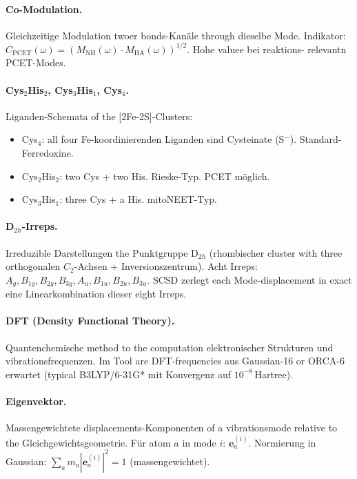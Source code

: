 \documentclass[11pt,a4paper,twoside]{article}
\theoremstyle{remark}
\begin{document}
\paragraph{Co-Modulation.}
Gleichzeitige Modulation twoer bonds-Kan\"ale through dieselbe
Mode. Indikator: $C_\text{PCET}(\omega) = (M_\text{NH}(\omega)
\cdot M_\text{HA}(\omega))^{1/2}$. Hohe valuee bei reaktions-
relevantn PCET-Modes.

\paragraph{Cys$_2$His$_2$, Cys$_3$His$_1$, Cys$_4$.}
Liganden-Schemata of the [2Fe-2S]-Clusters:
\begin{itemize}\setlength{\itemsep}{0pt}
  \item Cys$_4$: all four Fe-koordinierenden Liganden sind
        Cysteinate (S$^-$). Standard-Ferredoxine.
  \item Cys$_2$His$_2$: two Cys + two His. Rieske-Typ. PCET m\"oglich.
  \item Cys$_3$His$_1$: three Cys + a His. mitoNEET-Typ.
\end{itemize}

\paragraph{D$_{2h}$-Irreps.}
Irreduzible Darstellungen the Punktgruppe D$_{2h}$ (rhombischer
cluster with three orthogonalen $C_2$-Achsen + Inversionszentrum).
Acht Irreps: $A_g, B_{1g}, B_{2g}, B_{3g}, A_u, B_{1u}, B_{2u},
B_{3u}$. SCSD zerlegt each Mode-displacement in exact eine
Linearkombination dieser eight Irreps.

\paragraph{DFT (Density Functional Theory).}
Quantenchemische method to the computation elektronischer Strukturen
und vibrationsfrequenzen. Im Tool are DFT-frequencies aus
Gaussian-16 or ORCA-6 erwartet (typical B3LYP/6-31G* mit
Konvergenz auf $10^{-8}$\,Hartree).

\paragraph{Eigenvektor.}
Massengewichtete displacements-Komponenten of a vibrationsmode
relative to the Gleichgewichtsgeometrie. F\"ur atom $a$ in mode $i$:
$\mathbf{e}_a^{(i)}$. Normierung in Gaussian: $\sum_a m_a
|\mathbf{e}_a^{(i)}|^2 = 1$ (massengewichtet).
\end{document}
